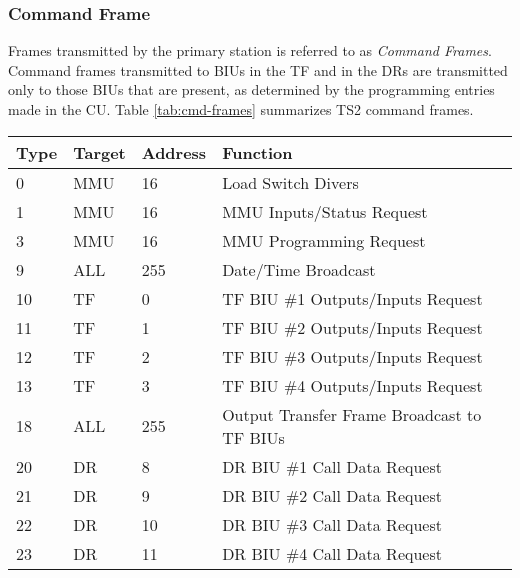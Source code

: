 \documentclass[]{article}
\begin{document}
\clearpage

\subsubsection {Command Frame}
Frames transmitted by the primary station is referred to as \textit{Command Frames}. Command frames transmitted to BIUs in the TF and in the DRs are transmitted only to those BIUs that are present, as determined by the programming entries made in the CU. Table \ref{tab:cmd-frames} summarizes TS2 command frames.

\begin{table}[ht]
	\footnotesize
	\begin{tabular}{llll}
		\hline
		\textbf{Type} & \textbf{Target} & \textbf{Address} & \textbf{Function}                          \\ \hline
		0             & MMU             & 16               & Load Switch Divers                         \\
		1             & MMU             & 16               & MMU Inputs/Status Request                  \\
		3             & MMU             & 16               & MMU Programming Request                    \\
		9             & ALL             & 255              & Date/Time Broadcast                        \\
		10            & TF              & 0                & TF BIU \#1 Outputs/Inputs Request          \\
		11            & TF              & 1                & TF BIU \#2 Outputs/Inputs Request          \\
		12            & TF              & 2                & TF BIU \#3 Outputs/Inputs Request          \\
		13            & TF              & 3                & TF BIU \#4 Outputs/Inputs Request          \\
		18            & ALL             & 255              & Output Transfer Frame Broadcast to TF BIUs \\
		20            & DR              & 8                & DR BIU \#1 Call Data Request               \\
		21            & DR              & 9                & DR BIU \#2 Call Data Request               \\
		22            & DR              & 10               & DR BIU \#3 Call Data Request               \\
		23            & DR              & 11               & DR BIU \#4 Call Data Request               \\

\end{tabular}
\end{table}
\end{document}
